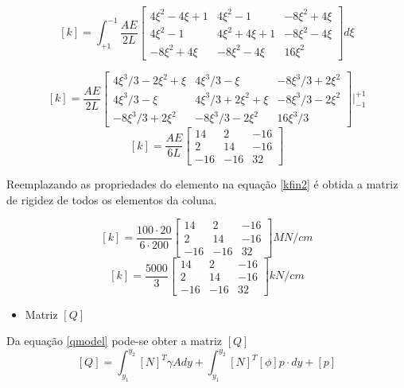 \documentclass{article} %
\begin{document}
\begin{equation*}\label{}
[k]= \int_{+1}^{-1}\frac{AE}{2L}\begin{bmatrix}
4\xi^2-4\xi+1&4\xi^2-1&-8\xi^2+4\xi\\
4\xi^2-1&4\xi^2+4\xi+1&-8\xi^2-4\xi\\
-8\xi^2+4\xi&-8\xi^2-4\xi&16\xi^2
\end{bmatrix}d\xi
\end{equation*}

\begin{equation*}\label{}
[k]= \frac{AE}{2L}\begin{bmatrix}
4\xi^3/3-2\xi^2+\xi&4\xi^3/3-\xi&-8\xi^3/3+2\xi^2\\
4\xi^3/3-\xi&4\xi^3/3+2\xi^2+\xi&-8\xi^3/3-2\xi^2\\
-8\xi^3/3+2\xi^2&-8\xi^3/3-2\xi^2&16\xi^3/3
\end{bmatrix}\biggr|_{-1}^{+1}
\end{equation*}
\begin{equation}\label{kfin2}
[k]= \frac{AE}{6L}\begin{bmatrix}
14 &2&-16 \\
2&14&-16\\
-16&-16&32
\end{bmatrix}
\end{equation}

\indent Reemplazando as propriedades do elemento na equação \ref{kfin2} é obtida a matriz de rigidez de todos os elementos da coluna.

\begin{equation*}\label{}
[k]= \frac{100 \cdot 20}{6\cdot 200}\begin{bmatrix}
14 &2&-16 \\
2&14&-16\\
-16&-16&32
\end{bmatrix}MN/cm
\end{equation*}
\begin{equation*}\label{}
[k]= \frac{5000}{3}\begin{bmatrix}
14 &2&-16 \\
2&14&-16\\
-16&-16&32
\end{bmatrix}kN/cm
\end{equation*}
\begin{itemize}
	\item Matriz \([Q]\)
\end{itemize}

Da equação \ref{qmodel} pode-se obter a matriz \([Q]\)
\begin{equation*}\label{}
[Q]=\int_{y_1}^{y_2}[N]^T\gamma Ady+\int_{y_1}^{y_2}[N]^T[\phi]p\cdot dy+[p]
\end{equation*}
\end{document}
